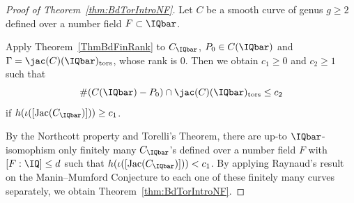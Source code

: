 
\begin{proof}[Proof of Theorem~\ref{thm:BdTorIntroNF}]
Let $C$ be a smooth curve of genus $g\ge 2$  defined over a number field $F\subset\IQbar$.

Apply Theorem~\ref{ThmBdFinRank} to $C_{\IQbar}$, $P_0 \in C(\IQbar)$
and $\Gamma = \jac(C)({\IQbar})_{\mathrm{tors}}$, whose rank is $0$. Then we obtain $c_1 \ge 0$ and $c_2 \ge 1$ such that
  \[
  \#(C(\IQbar) - P_0) \cap \jac(C)({\IQbar})_{\mathrm{tors}} \le c_2
  \]
  if $h(\iota([\mathrm{Jac}(C_\IQbar)])) \ge c_1$.

By the Northcott property and Torelli's Theorem, there are up-to
$\IQbar$-isomophism only finitely many $C_{\IQbar}$'s  defined over a number field $F$ with $[F:\IQ] \le d$ such that  $h(\iota([\mathrm{Jac}(C_\IQbar)])) < c_1$. By applying Raynaud's result on the Manin--Mumford Conjecture to each one of these finitely many curves separately, we obtain Theorem~\ref{thm:BdTorIntroNF}.
\end{proof}



%

\appendix


% 

% 

